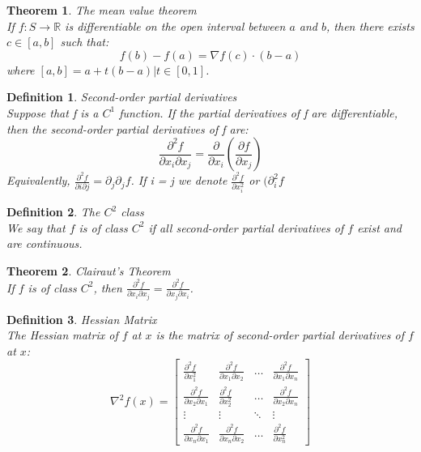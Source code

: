 \documentclass[11pt]{book} %
\newtheorem{theorem}{Theorem}[section]
\newtheorem{definition}{Definition}[section]
\begin{document}
\begin{theorem}{The mean value theorem} \\
If $f: S \rightarrow \mathbb{R}$ is differentiable on the open interval between $a$ and $b$, then there exists $c \in [a,b]$ such that:
\begin{equation}
    f(b) - f(a) = \nabla f(c) \cdot (b-a)
\end{equation}
where $[a,b] = {a + t(b-a) | t \in [0,1]}$.
\end{theorem}

\bigbreak

\begin{definition}{Second-order partial derivatives} \\
Suppose that f is a $C^1$ function. If the partial derivatives of f are differentiable, then the second-order partial derivatives of f are:
\begin{equation}
    \frac{\partial^2 f}{\partial x_i \partial x_j} = \frac{\partial}{\partial x_i} \left( \frac{\partial f}{\partial x_j} \right) 
\end{equation}
Equivalently, $\frac{\partial^2 f}{\partial i \partial j} = \partial_j \partial_j f$.
If i = j we denote $\frac{\partial^2 f}{\partial x_i^2}$ or $(\partial_i^2 f$
\end{definition}

\bigbreak

\begin{definition}{The $C^2$ class} \\
We say that $f$ is of class $C^2$ if all second-order partial derivatives of $f$ exist and are continuous.
\end{definition}

\bigbreak

\begin{theorem}{Clairaut's Theorem} \\
If $f$ is of class $C^2$, then $\frac{\partial^2 f}{\partial x_i \partial x_j} = \frac{\partial^2 f}{\partial x_j \partial x_i}$.
\end{theorem}

\bigbreak

\begin{definition}{Hessian Matrix} \\
The Hessian matrix of $f$ at $x$ is the matrix of second-order partial derivatives of $f$ at $x$:
\begin{equation}
    \nabla^2 f(x) = \begin{bmatrix}
    \frac{\partial^2 f}{\partial x_1^2} & \frac{\partial^2 f}{\partial x_1 \partial x_2} & \ldots & \frac{\partial^2 f}{\partial x_1 \partial x_n} \\
    \frac{\partial^2 f}{\partial x_2 \partial x_1} & \frac{\partial^2 f}{\partial x_2^2} & \ldots & \frac{\partial^2 f}{\partial x_2 \partial x_n} \\
    \vdots & \vdots & \ddots & \vdots \\
    \frac{\partial^2 f}{\partial x_n \partial x_1} & \frac{\partial^2 f}{\partial x_n \partial x_2} & \ldots & \frac{\partial^2 f}{\partial x_n^2}
    \end{bmatrix}
\end{equation}
\end{definition}
\end{document}
